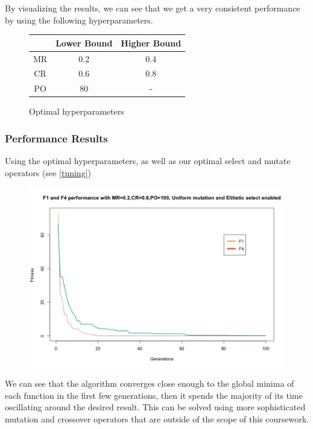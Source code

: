 \documentclass[openany]{article}
\begin{document}
				By visualizing the results, we can see that we get a very consistent performance by using the following hyperparameters.
				\begin{figure}[H]
					\centering
					\begin{center}
						\begin{tabular}{||c c c||} 
							\hline
							& Lower Bound & Higher Bound \\ [0.5ex] 
							\hline\hline
							MR & 0.2 & 0.4 \\ 
							\hline
							CR & 0.6 & 0.8 \\ 
							\hline
							PO & 80 & - \\ 
							\hline
						\end{tabular}
					\end{center}
					\caption{Optimal hyperparameters}
					\label{fig:sub1}
				\end{figure}
				\pagebreak
			\subsubsection{Performance Results}
				Using the optimal hyperparameters, as well as our optimal select and mutate operators (see \ref{tuning})
				\begin{figure}[H]
					\iftrue
					\centering
					\includegraphics[scale=0.4]{res/perfF1F4}
					\fi
				\end{figure}
				We can see that the algorithm converges close enough to the global minima of each function in the first few generations, then it spends 
				the majority of its time oscillating around the desired result. This can be solved using more sophisticated mutation and crossover operators
				that are outside of the scope of this coursework.
				
\end{document}
